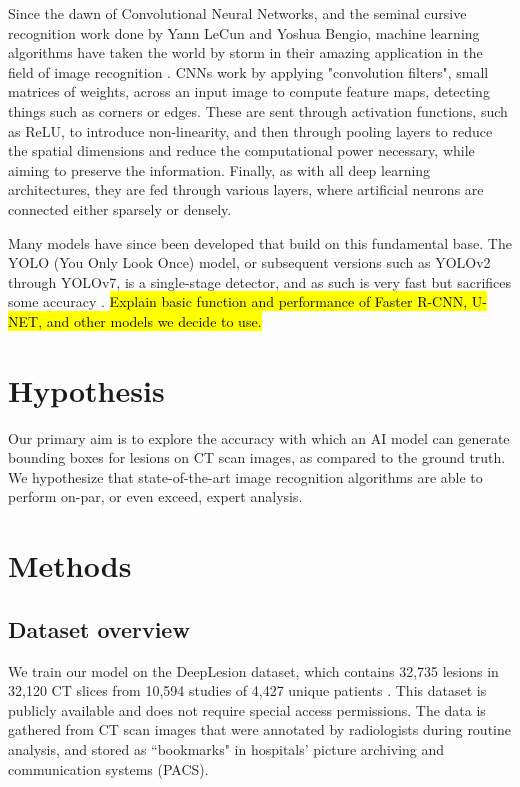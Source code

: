Since the dawn of Convolutional Neural Networks, and the seminal cursive recognition work done by Yann LeCun and Yoshua Bengio, machine learning algorithms have taken the world by storm in their amazing application in the field of image recognition \cite{cnn_lecun_bengio}. CNNs work by applying "convolution filters", small matrices of weights, across an input image to compute feature maps, detecting things such as corners or edges. These are sent through activation functions, such as ReLU, to introduce non-linearity, and then through pooling layers to reduce the spatial dimensions and reduce the computational power necessary, while aiming to preserve the information. Finally, as with all deep learning architectures, they are fed through various layers, where artificial neurons are connected either sparsely or densely. 

Many models have since been developed that build on this fundamental base. The YOLO (You Only Look Once) model, or subsequent versions such as YOLOv2 through YOLOv7, is a single-stage detector, and as such is very fast but sacrifices some accuracy \cite{yolo}. \hl{Explain basic function and performance of Faster R-CNN, U-NET, and other models we decide to use.}


\section{Hypothesis}
Our primary aim is to explore the accuracy with which an AI model can generate bounding boxes for lesions on CT scan images, as compared to the ground truth. We hypothesize that state-of-the-art image recognition algorithms are able to perform on-par, or even exceed, expert analysis.

\section{Methods}
\subsection{Dataset overview}
We train our model on the DeepLesion dataset, which contains 32,735 lesions in 32,120 CT slices from 10,594 studies of 4,427 unique patients \cite{deeplesion}. This dataset is publicly available and does not require special access permissions. The data is gathered from CT scan images that were annotated by radiologists during routine analysis, and stored as ``bookmarks" in hospitals' picture archiving and communication systems (PACS).  

